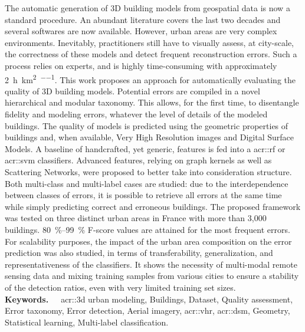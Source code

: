 The automatic generation of 3D building models from geospatial data is now a standard procedure.
An abundant literature covers the last two decades and several softwares are now available.
However, urban areas are very complex environments.
Inevitably, practitioners still have to visually assess, at city-scale, the correctness of these models and detect frequent reconstruction errors.
Such a process relies on experts, and is highly time-consuming with approximately \SI[per-mode=repeated-symbol]{2}{\hour\per\km\squared\per\expert}.
This work proposes an approach for automatically evaluating the quality of 3D building models.
Potential errors are compiled in a novel hierarchical and modular taxonomy.
This allows, for the first time, to disentangle fidelity and modeling errors, whatever the level of details of the modeled buildings.
The quality of models is predicted using the geometric properties of buildings and, when available, Very High Resolution images and Digital Surface Models.
A baseline of handcrafted, yet generic, features is fed into a \acrlong*{acr::rf} or \acrlong*{acr::svm} classifiers.
Advanced features, relying on graph kernels as well as Scattering Networks, were proposed to better take into consideration structure.
Both multi-class and multi-label cases are studied: due to the interdependence between classes of errors, it is possible to retrieve all errors at the same time while simply predicting correct and erroneous buildings.
The proposed framework was tested on three distinct urban areas in France with more than 3,000 buildings.
\SIrange{80}{99}{\percent} F-score values are attained for the most frequent errors.
For scalability purposes, the impact of the urban area composition on the error prediction was also studied, in terms of transferability, generalization, and representativeness of the classifiers.
It shows the necessity of multi-modal remote sensing data and mixing training samples from various cities to ensure a stability of the detection ratios, even with very limited training set sizes.\\

\textbf{Keywords.}~\ ~\Acrshort*{acr::3d} urban modeling, Buildings, Dataset, Quality assessment, Error taxonomy, Error detection, Aerial imagery, \acrlong*{acr::vhr}, \acrlong*{acr::dsm}, Geometry, Statistical learning, Multi-label classification.\\

